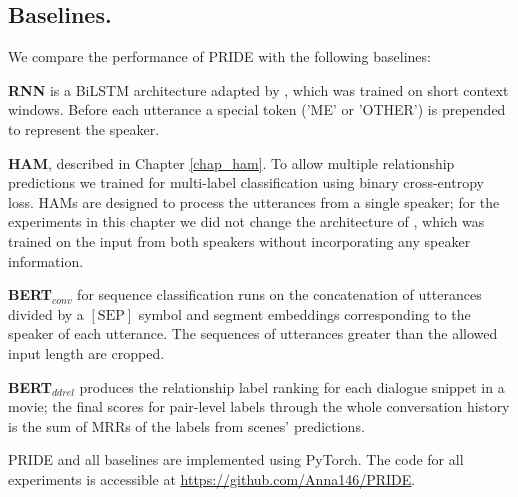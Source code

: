 \subsection{Baselines.}
 We compare the performance of PRIDE with the following baselines:
 \squishlist
     \item \textbf{RNN} is a BiLSTM \cite{graves2005framewise} architecture adapted by \citet{welch2019look}, which was trained on short context windows. Before each utterance a special token ('\textlangle ME\textrangle' or '\textlangle OTHER\textrangle') is prepended to represent the speaker.
     \item \textbf{HAM}, described in Chapter \ref{chap_ham}. To allow multiple relationship predictions we trained  for multi-label classification using binary cross-entropy loss. HAMs are designed to process the utterances from a single speaker; for the experiments in this chapter we did not change the architecture of , which was trained on the input from both speakers without incorporating any speaker information.
     \item \textbf{BERT$_{conv}$} for sequence classification \cite{lu2020improving} runs on the concatenation of utterances divided by a $[\textrm{SEP}]$ symbol and segment embeddings corresponding to the speaker of each utterance. The sequences of utterances greater than the allowed input length are cropped.
     \item \textbf{BERT$_{ddrel}$} 
     \cite{jia2020ddrel} 
     produces the relationship label ranking for each dialogue snippet in a movie; the final scores for pair-level labels through the whole conversation history is the sum of MRRs of the labels from scenes' predictions.
 \squishend
 
 \vspace{8pt}
 PRIDE and all baselines are implemented using \gls{PyTorch}. The code for all experiments is accessible at \href{https://github.com/Anna146/PRIDE}{https://github.com/Anna146/PRIDE}.